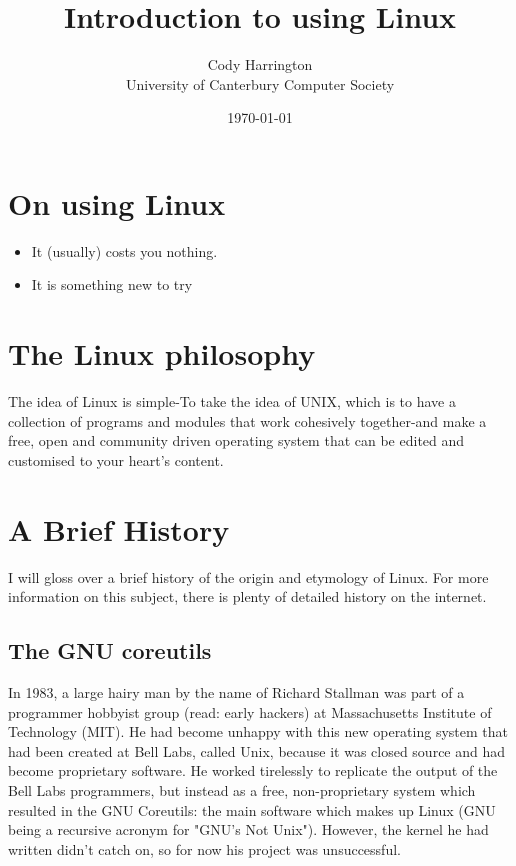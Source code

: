 \documentclass{article}
\begin{document}
\title{Introduction to using Linux}
\author{Cody Harrington\\University of Canterbury Computer Society}
\date{\today}
\maketitle

\section{On using Linux}
\begin{itemize}
\item It (usually) costs you nothing.
\item It is something new to try
\end{itemize}

\section{The Linux philosophy}
The idea of Linux is simple-To take the idea of UNIX, which is to have a collection of programs and modules that work cohesively together-and make a free, open and community driven operating system that can be edited and customised to your heart's content.

\section{A Brief History}

I will gloss over a brief history of the origin and etymology of Linux. For more information on this subject, there is plenty of detailed history on the internet.

\subsection{The GNU coreutils}
In 1983, a large hairy man by the name of Richard Stallman was part of a programmer hobbyist group (read: early hackers) at Massachusetts Institute of Technology (MIT). He had become unhappy with this new operating system that had been created at Bell Labs, called Unix, because it was closed source and had become proprietary software. He worked tirelessly to replicate the output of the Bell Labs programmers, but instead as a free, non-proprietary system which resulted in the GNU Coreutils: the main software which makes up Linux (GNU being a recursive acronym for "GNU's Not Unix"). However, the kernel he had written didn't catch on, so for now his project was unsuccessful.
\end{document}
